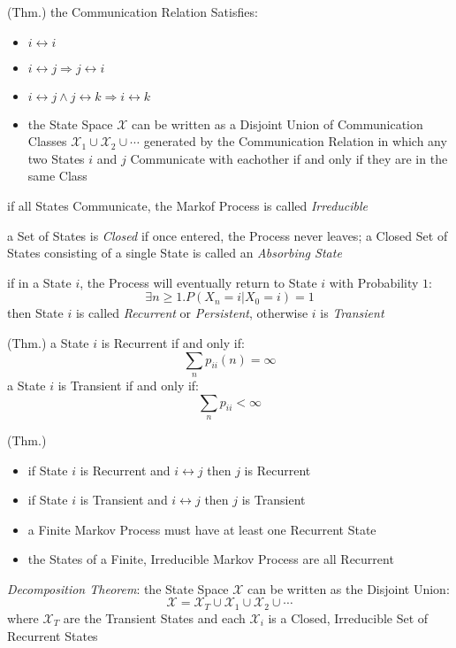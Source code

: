 (Thm.) the Communication Relation Satisfies:
\begin{itemize}
  \item $i \leftrightarrow i$
  \item $i \leftrightarrow j \Longrightarrow j \leftrightarrow i$
  \item $i \leftrightarrow j \wedge j \leftrightarrow k \Longrightarrow
    i \leftrightarrow k$
  \item the State Space $\mathcal{X}$ can be written as a Disjoint Union of
    Communication Classes $\mathcal{X}_1 \cup \mathcal{X}_2 \cup \cdots$
    generated by the Communication Relation in which any two States $i$ and $j$
    Communicate with eachother if and only if they are in the same Class
\end{itemize}

if all States Communicate, the Markof Process is called \emph{Irreducible}

a Set of States is \emph{Closed} if once entered, the Process never leaves; a
Closed Set of States consisting of a single State is called an \emph{Absorbing
  State}

if in a State $i$, the Process will eventually return to State $i$ with
Probability $1$:
\[
  \exists n \geq 1 . P(X_n = i | X_0 = i) = 1
\]
then State $i$ is called \emph{Recurrent} or \emph{Persistent}, otherwise $i$ is
\emph{Transient}

(Thm.) a State $i$ is Recurrent if and only if:
\[
  \sum_n p_{ii}(n) = \infty
\]
a State $i$ is Transient if and only if:
\[
  \sum_n p_{ii} < \infty
\]

(Thm.)
\begin{itemize}
  \item if State $i$ is Recurrent and $i \leftrightarrow j$ then $j$ is
    Recurrent
  \item if State $i$ is Transient and $i \leftrightarrow j$ then $j$ is
    Transient
  \item a Finite Markov Process must have at least one Recurrent State
  \item the States of a Finite, Irreducible Markov Process are all Recurrent
\end{itemize}

\emph{Decomposition Theorem}:
the State Space $\mathcal{X}$ can be written as the Disjoint Union:
\[
  \mathcal{X} = \mathcal{X}_T \cup \mathcal{X}_1 \cup \mathcal{X}_2 \cup \cdots
\]
where $\mathcal{X}_T$ are the Transient States and each $\mathcal{X}_i$ is a
Closed, Irreducible Set of Recurrent States

